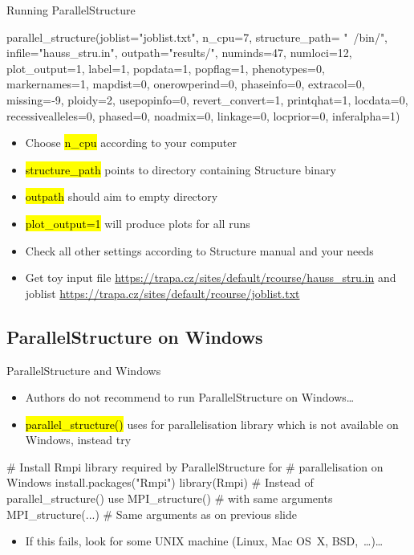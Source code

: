 \documentclass[compress, ucs, xelatex, 11pt, xcolor=svgnames,
  hyperref={
    bookmarks=true,
    unicode=true,
    colorlinks=true,
    pdftitle={Molecular data in R},
    plainpages=false,
    pdfauthor={Vojtech Zeisek},
    pdfsubject={Course about phylogeny and evolution in R},
    pdfcreator={XeLaTeX},
    pdfkeywords={R, evolution, phylogeny, molecular data},
    linkcolor=Tomato,
    anchorcolor=SaddleBrown,
    citecolor=Goldenrod,
    filecolor=DarkMagenta,
    menucolor=Sienna,
    urlcolor=DarkTurquoise,
    pdftex},
  url={hyphens, lowtilde} %
  ]{beamer}
\renewcommand{\texttt}[1]{\hl{\ttfamily #1}}
\begin{document}
\begin{frame}[fragile]{Running ParallelStructure}
  \begin{spluscode}
    parallel_structure(joblist="joblist.txt", n_cpu=7, structure_path=
      "~/bin/", infile="hauss_stru.in", outpath="results/", numinds=47,
      numloci=12, plot_output=1, label=1, popdata=1, popflag=1,
      phenotypes=0, markernames=1, mapdist=0, onerowperind=0, phaseinfo=0,
      extracol=0, missing=-9, ploidy=2, usepopinfo=0, revert_convert=1,
      printqhat=1, locdata=0, recessivealleles=0, phased=0, noadmix=0,
      linkage=0, locprior=0, inferalpha=1)
  \end{spluscode}
\begin{itemize}
 \item Choose \texttt{n\_cpu} according to your computer
 \item \texttt{structure\_path} points to \alert{directory} containing Structure binary
 \item \texttt{outpath} should aim to \alert{empty} directory
 \item \texttt{plot\_output=1} will produce plots for all runs
 \item Check all other settings according to Structure manual and your needs
 \item Get toy input file \url{https://trapa.cz/sites/default/rcourse/hauss_stru.in} and joblist \url{https://trapa.cz/sites/default/rcourse/joblist.txt}
\end{itemize}
\end{frame}

\subsection{ParallelStructure on Windows}

\begin{frame}[fragile]{ParallelStructure and Windows}
\begin{itemize}
 \item Authors do not recommend to run ParallelStructure on Windows\ldots
 \item \texttt{parallel\_structure()} uses for parallelisation library which is not available on Windows, instead try
\end{itemize}
  \begin{spluscode}
    # Install Rmpi library required by ParallelStructure for
    # parallelisation on Windows
    install.packages("Rmpi")
    library(Rmpi)
    # Instead of parallel_structure() use MPI_structure()
    # with same arguments
    MPI_structure(...) # Same arguments as on previous slide
  \end{spluscode}
\begin{itemize}
 \item If this fails, look for some UNIX machine (Linux, Mac OS~X, BSD,~\ldots)\ldots
\end{itemize}
\end{frame}
\end{document}
